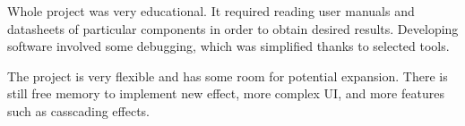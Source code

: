 \documentclass[a4paper,twoside,12pt]{book}
\newcounter{PagesWithoutNumbers}
\begin{document}
Whole project was very educational.
It required reading user manuals and datasheets of particular components
in order to obtain desired results.
Developing software involved some debugging,
which was simplified thanks to selected tools.

The project is very flexible and has some room for potential expansion.
There is still free memory to implement new effect, more complex UI,
and more features such as casscading effects.

\backmatter
{}
\setcounter{page}{\value{PagesWithoutNumbers}}

\pagestyle{onlyPageNumbers}

\printbibliography

\end{document}
